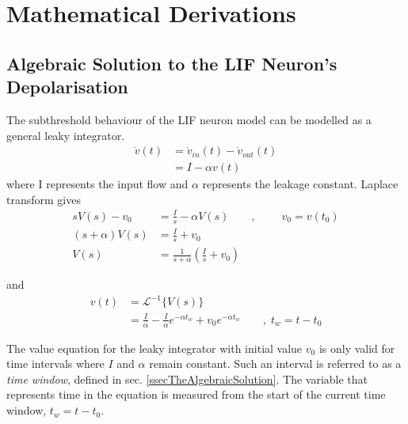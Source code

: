 
\chapter{Mathematical Derivations}

\section{Algebraic Solution to the LIF Neuron's Depolarisation}
\label{appendixAlgebraicSolution}
	The subthreshold behaviour of the LIF neuron model can be modelled as a general leaky integrator.
	\begin{equation}
		\begin{split}
			\dot{v}(t)&= \dot{v}_{in}(t) - \dot{v}_{out}(t) \\
				&= I - \alpha v(t)
		\end{split}
		\label{appendix:eqDifferentialEquation}
	\end{equation}
		where I represents the input flow and $\alpha$ represents the leakage constant.
		Laplace transform gives
	\begin{equation}
		\begin{split}
			sV(s)-v_0 		&= \frac{I}{s} - \alpha V(s) 			\qquad, \; \qquad v_0 = v(t_0) 				\\
			(s+\alpha)V(s) 	&= \frac{I}{s} + v_0 														\\
			V(s) 			&= \frac{1}{s+\alpha}\left( \frac{I}{s} + v_0 \right)
		\end{split}
		\nonumber
	\end{equation}

	and 
	\begin{equation}
		\begin{split}
			v(t)  	&= 		\mathscr{L}^{-1}\bigg\{ V(s) \bigg\}  									\\
			 		&=		\frac{I}{\alpha} - \frac{I}{\alpha} e^{-\alpha t_w} + v_0 e^{-\alpha t_w} \qquad, \; t_w = t - t_0
		\end{split}
		\label{appendix:eqValueEquationUTLEDING}
 	\end{equation}

	The value equation for the leaky integrator with initial value $v_0$ is only valid for time intervals where $I$ and $\alpha$ remain constant.
	Such an interval is referred to as a \emph{time window}, defined in sec. \ref{ssecTheAlgebraicSolution}.
	The variable that represents time in the equation is measured from the start of the current time window, $t_w = t - t_0$.





